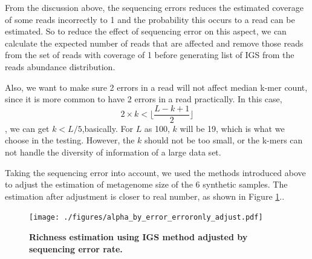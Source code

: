 From the discussion above, the sequencing errors reduces the estimated coverage of some
reads incorrectly to 1 and the probability this occurs to a read can be
estimated. So to reduce the effect of sequencing error on this aspect, we can
calculate the expected number of reads that are affected and remove those reads
from the set of reads with coverage of 1 before generating list of IGS from the
reads abundance distribution.

Also, we want to make sure 2 errors in a read will not affect median k-mer 
count, since it is more common to have 2 errors in a read practically. 
In this case, 
\[2 \times k < \lfloor \frac{L-k+1}{2}\rfloor \],
we can get $k<L/5$,basically. For $L$ as 100, $k$ will be 19, which is what we 
choose in the testing. However, the $k$ should not be too small, or the k-mers 
can not handle the diversity of information of a large data set.

Taking the sequencing error into account, we used the methods introduced above
to adjust the estimation of metagenome size of the 6 synthetic samples. The
estimation after adjustment is closer to real number, as shown in Figure
\ref{fig:IGS_richness_error_adjustment}..


\begin{figure}[!ht]
 \centerline{\texttt{[image: ./figures/alpha\_by\_error\_erroronly\_adjust.pdf]}}
\caption{\bf Richness estimation using IGS method adjusted by sequencing error
rate.}
\label{fig:IGS_richness_error_adjustment}
\end{figure}

